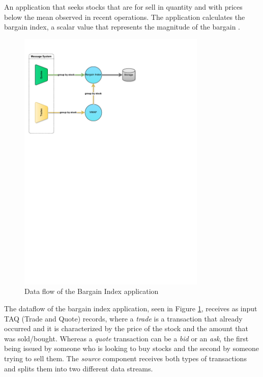 \documentclass[ppgc,diss,english]{iiufrgs}
\begin{document}
An application that seeks stocks that are for sell in quantity and with prices below the mean observed in recent operations. The application calculates the bargain index, a scalar value that represents the magnitude of the bargain \cite{gedik2008spade, andrade2009scale, dayarathna2013automatic}.


\begin{figure}[!ht]
	\centering
	\includegraphics[width=0.8\textwidth]{images/apps/BargainIndex.pdf}
	\caption{Data flow of the Bargain Index application}
	\label{fig:app_bargain_index}
\end{figure}

The dataflow of the bargain index application, seen in Figure \ref{fig:app_bargain_index}, receives as input TAQ (Trade and Quote) records, where a \emph{trade} is a transaction that already occurred and it is characterized by the price of the stock and the amount that was sold/bought. Whereas a \emph{quote} transaction can be a \emph{bid} or an \emph{ask}, the first being issued by someone who is looking to buy stocks and the second by someone trying to sell them. The \emph{source} component receives both types of transactions and splits them into two different data streams.
\end{document}
